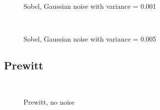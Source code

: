 \documentclass[10pt,a4paper]{article}
\begin{document}
\begin{figure}
  \centering
     \\
  \caption{Sobel, Gaussian noise with variance = 0.001}
  \label{fig:sobel_001}
\end{figure}

\begin{figure}
  \centering
     \\
  \caption{Sobel, Gaussian noise with variance = 0.005}
  \label{fig:sobel_005}
\end{figure}

\subsection{Prewitt}
\begin{figure}
  \centering
     \\
  \caption{Prewitt, no noise}
  \label{fig:prewitt_no_noise}
\end{figure}
\end{document}
